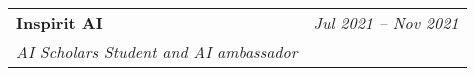 \documentclass[letterpaper,11pt]{article}
\makeatletter
\newcommand{\resumeOrganizationHeading}[4]{
  \vspace{-2pt}\item
    \begin{tabular*}{0.97\textwidth}[t]{l@{\extracolsep{\fill}}r}
      \textbf{#1} & \textit{\small #2} \\
      \textit{\small#3}
    \end{tabular*}\vspace{-7pt}
}
\newcommand{\resumeSubHeadingListStart}{\begin{itemize}[leftmargin=0.15in, label={}]}
\newcommand{\resumeSubHeadingListEnd}{\end{itemize}}
\makeatother
\begin{document}
     \resumeOrganizationHeading
     {Inspirit AI}{Jul 2021 -- Nov 2021}{AI Scholars Student and AI ambassador}

     

  
 \resumeSubHeadingListEnd





        




    
    











\end{document}
